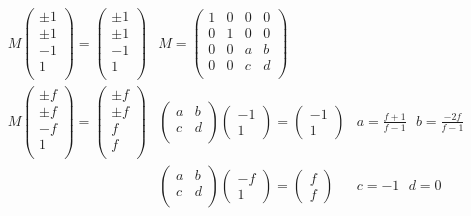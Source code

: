 \documentclass[11pt]{article}
\begin{document}
\begin{eqnarray*}
M \begin{pmatrix}
\pm 1 \\ \pm 1 \\ -1 \\ 1 \\
\end{pmatrix} =  \begin{pmatrix}
\pm 1 \\ \pm 1 \\ -1 \\ 1 \\
\end{pmatrix} & M = 
\begin{pmatrix}
1 & 0 & 0 & 0 \\
0 & 1 & 0 & 0 \\
0 & 0 & a & b \\
0 & 0 & c & d \\
\end{pmatrix}
& \\
M \begin{pmatrix}
\pm f \\ \pm f \\ -f \\ 1 \\
\end{pmatrix} =  \begin{pmatrix}
\pm f \\ \pm f \\ f \\ f \\
\end{pmatrix} & \begin{pmatrix}
a & b \\ c & d \\
\end{pmatrix}
\begin{pmatrix}
-1 \\ 1
\end{pmatrix}
=
\begin{pmatrix}
-1 \\ 1
\end{pmatrix} & a = \frac{f+1}{f-1} \text{   } b = \frac{-2f}{f-1}\\
& \begin{pmatrix}
a & b \\ c & d \\
\end{pmatrix}
\begin{pmatrix}
-f \\ 1
\end{pmatrix}
=
\begin{pmatrix}
f \\ f
\end{pmatrix} & c = -1 \text{   } d = 0
\end{eqnarray*}
\end{document}
